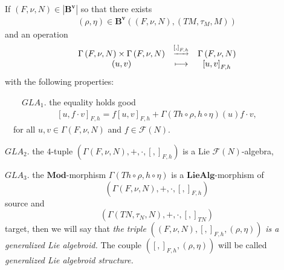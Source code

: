 \documentclass[11pt]{article}
\begin{document}
If $\left( F,\nu ,N\right) \in \left\vert \mathbf{B}^{\mathbf{v}}\right\vert
$ so that there exists
\begin{equation*}
\begin{array}{c}
\left( \rho ,\eta \right) \in \mathbf{B}^{\mathbf{v}}\left( \left( F,\nu
,N\right) ,\left( TM,\tau _{M},M\right) \right)%
\end{array}%
\end{equation*}%
and an operation
\begin{equation*}
\begin{array}{ccc}
\Gamma \left( F,\nu ,N\right) \times \Gamma \left( F,\nu ,N\right) & ^{%
\underrightarrow{\left[ ,\right] _{F,h}}} & \Gamma \left( F,\nu ,N\right) \\
\left( u,v\right) & \longmapsto & \left[ u,v\right] _{F,h}%
\end{array}%
\end{equation*}%
with the following properties:\bigskip

\noindent $\qquad GLA_{1}$. the equality holds good
\begin{equation*}
\begin{array}{c}
\left[ u,f\cdot v\right] _{F,h}=f\left[ u,v\right] _{F,h}+\Gamma \left(
Th\circ \rho ,h\circ \eta \right) \left( u\right) f\cdot v,%
\end{array}%
\end{equation*}%
\qquad \quad\ \ for all $u,v\in \Gamma \left( F,\nu ,N\right) $ and $f\in
\mathcal{F}\left( N\right) .$

\medskip $GLA_{2}$. the $4$-tuple $\left( \Gamma \left( F,\nu ,N\right)
,+,\cdot ,\left[ ,\right] _{F,h}\right) $ is a Lie $\mathcal{F}\left(
N\right) $-algebra,

$GLA_{3}$. the $\mathbf{Mod}$-morphism $\Gamma \left( Th\circ \rho ,h\circ
\eta \right) $ is a $\mathbf{LieAlg}$-morphism of
\begin{equation*}
\left( \Gamma \left( F,\nu ,N\right) ,+,\cdot ,\left[ ,\right] _{F,h}\right)
\end{equation*}
source and
\begin{equation*}
\left( \Gamma \left( TN,\tau _{N},N\right) ,+,\cdot ,\left[ ,\right]
_{TN}\right)
\end{equation*}
target, \medskip \noindent then we will say that \emph{the triple }$\left(
\left( F,\nu ,N\right) ,\left[ ,\right] _{F,h},\left( \rho ,\eta \right)
\right) $ \emph{is a generalized Lie algebroid. }The couple $\left( \left[ ,%
\right] _{F,h},\left( \rho ,\eta \right) \right) $ will be called \emph{%
generalized Lie algebroid structure.}
\end{document}
